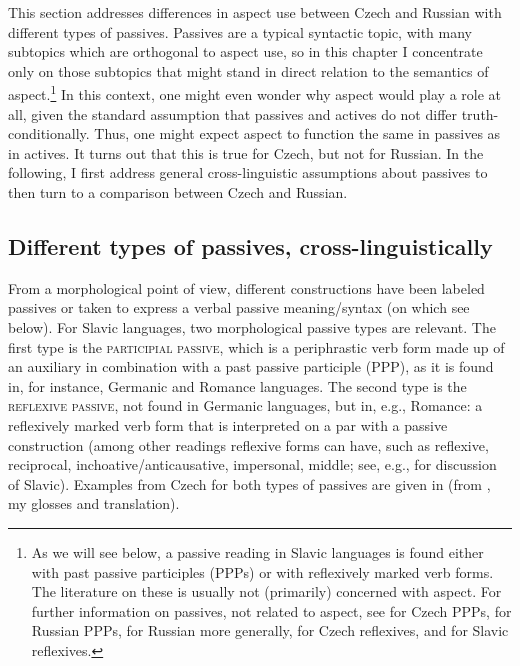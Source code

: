 \documentclass[output=paper,colorlinks,citecolor=brown]{langscibook}
\begin{document}
This section addresses differences in aspect use between Czech and Russian with different types of passives. Passives are a typical syntactic topic, with many subtopics which are orthogonal to aspect use, so in this chapter I concentrate only on those subtopics that might stand in direct relation to the semantics of aspect.\footnote{As we will see below, a passive reading in Slavic languages is found either with past passive participles (PPPs) or with reflexively marked verb forms. The literature on these is usually not (primarily) concerned with aspect. For further information on passives, not related to aspect, see \citet{veselovskakarlik, karlik17, karlik20, medovawiland, cahamedova20} for Czech PPPs, \citet{Schoorlemmer1995,Paslawska.Stechow2003,borik13,borik14} for Russian PPPs, %
\citet{babby09} for Russian more generally, \citet{medovadiss} for Czech reflexives, and \citet{fehrmann+10} for Slavic reflexives.}
 In this context, one might even wonder why aspect would play a role at all, given the standard assumption that passives and actives do not differ truth-conditionally. Thus, one might expect aspect to function the same in passives as in actives. It turns out that this is true for Czech, but not for Russian. In the following, I first address general cross-linguistic assumptions about passives to then turn to a comparison between Czech and Russian.

\subsection{Different types of passives, cross-linguistically}
\label{sec:passtypes}

From a morphological point of view, different constructions have been labeled passives or taken to express a verbal passive meaning/syntax (on which see below). For Slavic languages, two morphological passive types are relevant. 
The first type is the \textsc{participial passive}, which is a periphrastic verb form made up of an auxiliary in combination with a past passive participle (PPP), as it is found in, for instance, Germanic and Romance languages. The second type is the \textsc{reflexive passive}, not found in Germanic languages, but in, e.g., Romance: a reflexively marked verb form that is interpreted on a par with a passive construction (among other readings reflexive forms can have, such as reflexive, reciprocal, inchoative/anticausative, impersonal, middle; see, e.g., \citealt{babby09,medovadiss,fehrmann+10} for discussion of Slavic). Examples from Czech for both types of passives are given in  (from \citealt{karlik17}, my glosses and translation).
\end{document}
